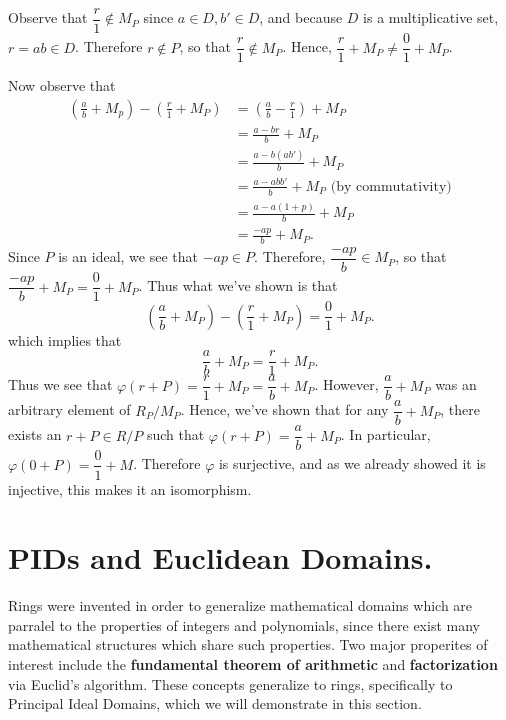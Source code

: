 \documentclass[12pt,letterpaper]{algebra_book}
\renewcommand{\phi}{\varphi}
\theoremstyle{definition}
\begin{document}
\begin{prf}
\begin{description}
    Observe that $\dfrac{r}{1} \not\in
    M_P$ since $a \in D, b' \in D$, and because $D$ is a
    multiplicative set, $r = ab \in D$. Therefore $r \not\in P$,
    so that $\dfrac{r}{1} \not\in M_P$. Hence, $\dfrac{r}{1} + M_P
    \ne \dfrac{0}{1} + M_P$. 

    Now observe that 
    \begin{align*}
        \left(\frac{a}{b} + M_p\right) - \left(\frac{r}{1} + M_P\right)
        & = \left( \frac{a}{b} - \frac{r}{1} \right) + M_P\\
        & = \frac{a - br}{b} + M_P\\
        & = \frac{a - b(ab')}{b} + M_P\\
        & = \frac{a - abb'}{b} + M_P \text{ (by commutativity)}\\
        & = \frac{a - a(1 + p)}{b} + M_P\\
        & = \frac{-ap}{b} + M_P.
    \end{align*}
    Since $P$ is an ideal, we see that $-ap \in P$. Therefore,
    $\dfrac{-ap}{b} \in M_P$, so that
    $\dfrac{-ap}{b} + M_P = \dfrac{0}{1} + M_P$. Thus what we've shown is that 
    \[
        \left(\frac{a}{b} + M_P\right) - \left( \frac{r}{1} + M_P \right) = \frac{0}{1} + M_P.
    \]
    which implies that 
    \[
        \frac{a}{b} + M_P = \frac{r}{1} + M_P.
    \]
    Thus we see that $\phi(r + P) = \dfrac{r}{1} + M_P =
    \dfrac{a}{b} + M_P$. However, $\dfrac{a}{b} + M_P$ was an
    arbitrary element of $R_P/M_P$. Hence, we've shown that for
    any $\dfrac{a}{b} + M_P$, there exists an $r + P\in R/P$ such that 
    $\phi(r + P) = \dfrac{a}{b} + M_P$. In particular, $\phi(0 + P) =
    \dfrac{0}{1} + M$. Therefore $\phi$ is surjective,
    and as we already showed it is injective, this makes it an
    isomorphism. 
\end{description}
\end{prf}


\newpage
\section{PIDs and Euclidean Domains.}

Rings were invented in order to generalize mathematical domains which
are parralel to the properties of integers and polynomials, since
there exist many mathematical structures which share such properties.
Two major properites of interest include the \textbf{fundamental
theorem of arithmetic} and \textbf{factorization} via Euclid's
algorithm. These concepts generalize to rings, specifically to
Principal Ideal Domains, which we will demonstrate in this section. 
\end{document}
